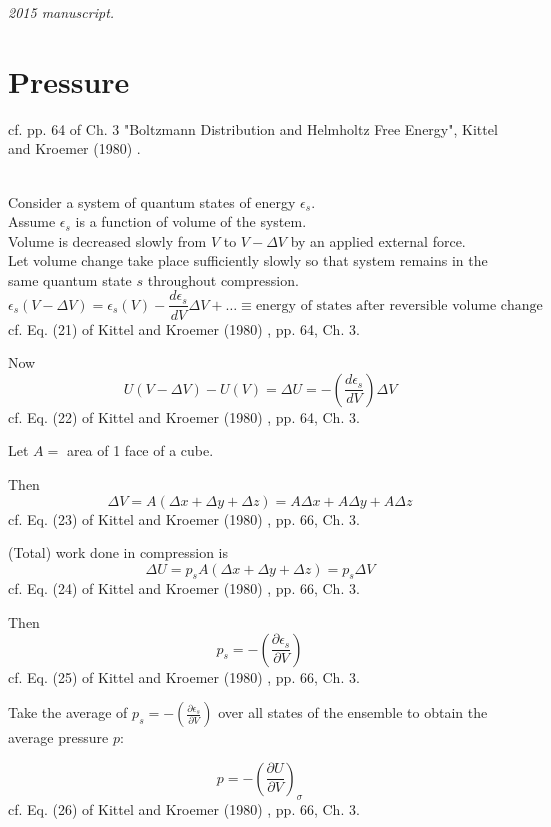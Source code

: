 \noindent\textit{2015 manuscript.}

\section{Pressure} 

cf. pp. 64 of Ch. 3 "Boltzmann Distribution and Helmholtz Free Energy", Kittel and Kroemer (1980) \cite{CKittelHKroemer1980}.

\quad \\ 
Consider a system of quantum states of energy $\epsilon_s$. \\
Assume $\epsilon_s$ is a function of volume of the system. \\
Volume is decreased slowly from $V$ to $V-\Delta V$ by an applied external force. \\
Let volume change take place sufficiently slowly so that system remains in the same quantum state $s$ throughout compression.
\[
\epsilon_s(V-\Delta V) = \epsilon_s(V) - \frac{d\epsilon_s}{ dV} \Delta V + \dots \equiv  \text{energy of states after reversible volume change }
\]
cf. Eq. (21) of Kittel and Kroemer (1980) \cite{CKittelHKroemer1980}, pp. 64, Ch. 3. 

Now
\[
U(V- \Delta V) - U(V) = \Delta U = -\left( \frac{d\epsilon_s}{ dV} \right)\Delta V
\]
cf. Eq. (22) of Kittel and Kroemer (1980) \cite{CKittelHKroemer1980}, pp. 64, Ch. 3. 

Let $A = $ area of 1 face of a cube.

Then 
\[
\Delta V = A(\Delta x + \Delta y + \Delta z) = A\Delta x + A\Delta y + A\Delta z
\]
cf. Eq. (23) of Kittel and Kroemer (1980) \cite{CKittelHKroemer1980}, pp. 66, Ch. 3. 

(Total) work done in compression is 
\[
\Delta U = p_s A(\Delta x + \Delta y + \Delta z) = p_s \Delta V
\]
cf. Eq. (24) of Kittel and Kroemer (1980) \cite{CKittelHKroemer1980}, pp. 66, Ch. 3. 

Then 
\[
p_s = - \left( \frac{ \partial \epsilon_s }{ \partial V} \right) 
\]
cf. Eq. (25) of Kittel and Kroemer (1980) \cite{CKittelHKroemer1980}, pp. 66, Ch. 3. 

Take the average of $p_s = -\left( \frac{\partial \epsilon_s }{ \partial V} \right)$ over all states of the ensemble to obtain the average pressure $p$:

\begin{equation}
\boxed{ p = - \left( \frac{ \partial U}{ \partial V} \right)_{\sigma} }
\end{equation}
cf. Eq. (26) of Kittel and Kroemer (1980) \cite{CKittelHKroemer1980}, pp. 66, Ch. 3. 

